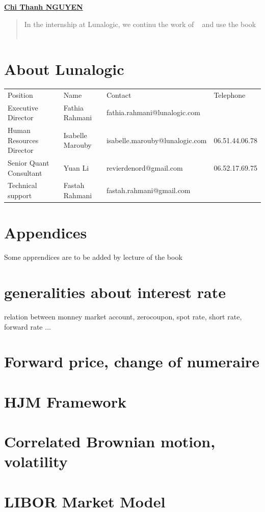 \documentclass[a4paper,10pt]{article}
\begin{document}
\begin{titlepage}
\begin{center}
\href{mailto:chithanhnguyen.math@gmail.com}{\LARGE{\textbf{Chi Thanh NGUYEN}}}
\end{center}



\vfill
\begin{abstract}
In the internship at Lunalogic, we continu the work of ~\cite{THAI2013} and use the book  ~\cite{BRIGO2006}
\end{abstract}
\end{titlepage}


\tableofcontents
\newpage

\newpage
\section{About Lunalogic}
\begin{tabular}{llll}
Position                 &            Name             & Contact                         &Telephone      \\
Executive Director       & Fathia Rahmani               & fathia.rahmani@lunalogic.com   &               \\
Human Resources Director & Isabelle Marouby             & isabelle.marouby@lunalogic.com &06.51.44.06.78 \\
Senior Quant Consultant  & Yuan Li                      & revierdenord@gmail.com         &06.52.17.69.75 \\    
Technical support        & Fastah Rahmani               & fastah.rahmani@gmail.com       &
\end{tabular}


\newpage
\section{Appendices}
\appendix
Some apprendices are to be added by lecture of the book ~\cite{BRIGO2006}
\section{generalities about interest rate}
relation between monney market account, zerocoupon, spot rate, short rate, forward rate ... 
\section{Forward price, change of numeraire}
\section{HJM Framework}
\section{Correlated Brownian motion, volatility}
\section{LIBOR Market Model}


\newpage


\end{document}
